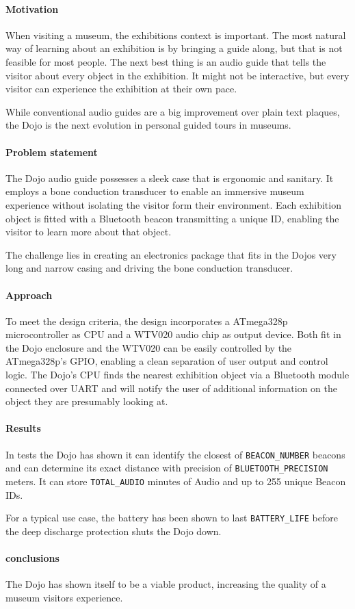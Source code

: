 \documentclass[a4paper]{article}
\begin{document}
\paragraph{Motivation}
When visiting a museum, the exhibitions context is important.
The most natural way of learning about an exhibition is by bringing a guide along, 
	but that is not feasible for most people.
The next best thing is an audio guide that tells the visitor about every object in the exhibition.
It might not be interactive, but every visitor can experience the exhibition at their own pace.

While conventional audio guides are a big improvement over plain text plaques,
	the Dojo is the next evolution in personal guided tours in museums.

\paragraph{Problem statement}
The Dojo audio guide possesses a sleek case that is ergonomic and sanitary.
It employs a bone conduction transducer to enable an immersive museum experience 
	without isolating the visitor form their environment.
Each exhibition object is fitted with a Bluetooth beacon transmitting a unique ID, 
	enabling the visitor to learn more about that object.

The challenge lies in creating an electronics package that fits in the Dojos very long and narrow casing
	and driving the bone conduction transducer.

\paragraph{Approach}
To meet the design criteria, the design incorporates a ATmega328p microcontroller as CPU
	and a WTV020 audio chip as output device.
Both fit in the Dojo enclosure and the WTV020 can be easily controlled by the ATmega328p's GPIO, 
	enabling a clean separation of user output and control logic.
The Dojo's CPU finds the nearest exhibition object via a Bluetooth module connected over UART 
	and will notify the user of additional information on the object they are presumably looking at.

\paragraph{Results}
In tests the Dojo has shown it can identify the closest of \texttt{BEACON\_NUMBER} beacons
	and can determine its exact distance with precision of \texttt{BLUETOOTH\_PRECISION} meters.
It can store \texttt{TOTAL\_AUDIO} minutes of Audio and up to 255 unique Beacon IDs.

For a typical use case, the battery has been shown to last \texttt{BATTERY\_LIFE}
	before the deep discharge protection shuts the Dojo down.

\paragraph{conclusions}
The Dojo has shown itself to be a viable product, increasing the quality of a museum visitors experience.
\end{document}
